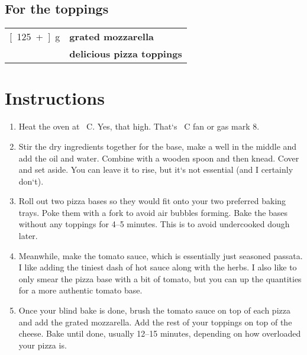 \documentclass[main.tex]{subfiles}
\begin{document}
\subsection{For the toppings}
\vspace*{-\baselineskip}
\begin{table}[ht]
	\begin{tabularx}{\textwidth}{>{\hsize=0.333\hsize}X>{\bf\hsize=1\hsize}X}
	\unit[125+]{g} & grated mozzarella \\
	\unit[]{} & delicious pizza toppings \\
	\end{tabularx}
\end{table}

\section{Instructions}

\begin{enumerate}
    \item Heat the oven at \unit[240]{\textdegree C}. Yes, that high. That`s \unit[220]{\textdegree C} fan or gas mark 8.
    \item Stir the dry ingredients together for the base, make a well in the middle and add the oil and water. Combine with a wooden spoon and then knead. Cover and set aside. You can leave it to rise, but it`s not essential (and I certainly don`t).
    \item Roll out two pizza bases so they would fit onto your two preferred baking trays. Poke them with a fork to avoid air bubbles forming. Bake the bases without any toppings for 4--5 minutes. This is to avoid undercooked dough later.
    \item Meanwhile, make the tomato sauce, which is essentially just seasoned passata. I like adding the tiniest dash of hot sauce along with the herbs. I also like to only smear the pizza base with a bit of tomato, but you can up the quantities for a more authentic tomato base.
    \item Once your blind bake is done, brush the tomato sauce on top of each pizza and add the grated mozzarella. Add the rest of your toppings on top of the cheese. Bake until done, usually 12--15 minutes, depending on how overloaded your pizza is.
	
\end{enumerate}

\end{document}

